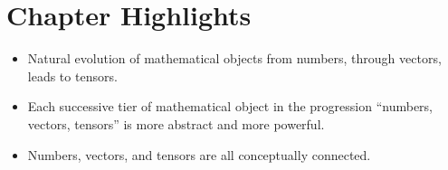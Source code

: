 \section*{Chapter Highlights}
{\chhc
  \it
\begin{itemize}
\item Natural evolution of mathematical objects from numbers, through
  vectors, leads to tensors.
\item Each successive tier of mathematical object in the progression
  ``numbers, vectors, tensors''  is more abstract and more powerful.
\item Numbers, vectors, and tensors are all conceptually connected.
\end{itemize}
}
